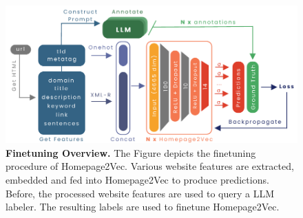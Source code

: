 \begin{figure}[!ht]
    \centering
    \includegraphics[height=0.2\textheight, width=\columnwidth]{./figures/training_overview.pdf}
    \caption{\textbf{Finetuning Overview.} The Figure depicts the finetuning procedure of Homepage2Vec. Various website features are extracted, embedded and fed into Homepage2Vec to produce predictions. Before, the processed website features are used to query a LLM labeler. The resulting labels are used to finetune Homepage2Vec.}
    \label{fig:train-overview}
\end{figure}

